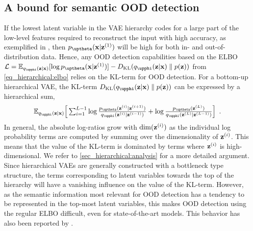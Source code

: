 {\subsection{A bound for semantic OOD detection}
If the lowest latent variable in the VAE hierarchy codes for a large part of the low-level features required to reconstruct the input with high accuracy, as exemplified in , then $p_\thetab(\xb|\zb^{(1)})$ will be high for both in- and out-of-distribution data.
Hence, any OOD detection capabilities based on the ELBO $\mathcal{L} = \mathbb{E}_{q_\phib(\zb|\xb)}[\log p_\thetab(\xb|\zb^{(1)})] - D_{\mathrm{KL}}( q_\phib(\zb|\xb) \parallel  p(\zb))$ from \cref{eq_hierarchical:elbo} relies on the KL-term for OOD detection. For a bottom-up hierarchical VAE, the KL-term $D_{\mathrm{KL}}( q_\phib(\zb|\xb) \parallel p(\zb))$ can be expressed by a hierarchical sum,%
\begin{equation}
    \mathbb{E}_{q_\phib(\zb|\xb)} \Big[ \textstyle\sum_{i=1}^{L-1} \log \frac{p_\thetab(\zb^{(i)}|\zb^{(i+1)})}{q_\phib(\zb^{(i)}|\zb^{(i-1)})} + \log \frac{p_\thetab(\zb^{(L)})}{q_\phib(\zb^{(L)}|\zb^{(L-1)})} \Big] \enspace .
\end{equation}
In general, the absolute log-ratios grow with $\mathrm{dim}({\mathbf{z}}^{(i)})$ as the individual log probability terms are computed by summing over the dimensionality of ${\mathbf{z}}^{(i)}$.
This means that the value of the KL-term is dominated by terms where ${\mathbf{z}}^{(i)}$ is high-dimensional. We refer to \cref{sec_hierarchical:analysis} for a more detailed argument.
Since hierarchical VAEs are generally constructed with a bottleneck type structure, the terms corresponding to latent variables towards the top of the hierarchy will have a vanishing influence on the value of the KL-term.
However, as the semantic information most relevant for OOD detection has a tendency to be represented in the top-most latent variables, this makes OOD detection using the regular ELBO difficult, even for state-of-the-art models.
This behavior has also been reported by \textcite{xiao_likelihood_2020}.

}
